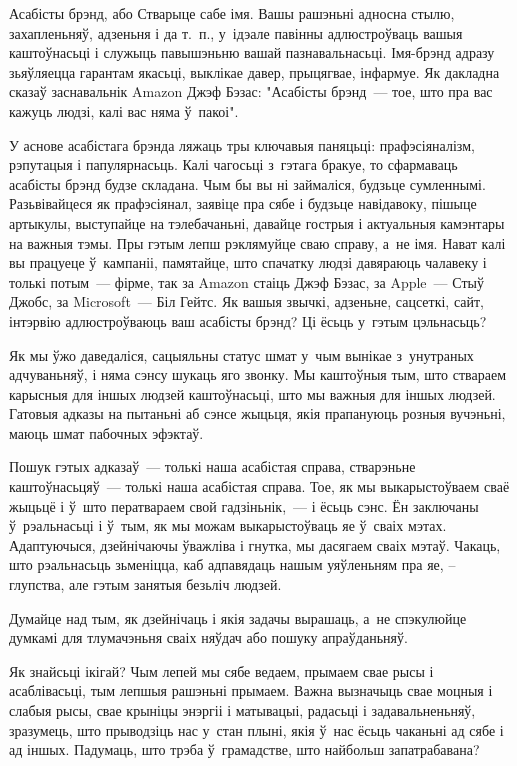 Асабісты брэнд, або Стварыце сабе імя. Вашы рашэньні адносна стылю, захапленьняў, адзеньня і да т.~п., у~ідэале павінны адлюстроўваць вашыя каштоўнасьці і служыць павышэньню вашай пазнавальнасьці. Імя-брэнд адразу зьяўляецца гарантам якасьці, выклікае давер, прыцягвае, інфармуе. Як дакладна сказаў заснавальнік Amazon Джэф Бэзас: "Асабісты брэнд~--- тое, што пра вас кажуць людзі, калі вас няма ў~пакоі".

У аснове асабістага брэнда ляжаць тры ключавыя паняцьці: прафэсіяналізм, рэпутацыя і папулярнасьць. Калі чагосьці з~гэтага бракуе, то сфармаваць асабісты брэнд будзе складана. Чым бы вы ні займаліся, будзьце сумленнымі. Разьвівайцеся як прафэсіянал, заявіце пра сябе і будзьце навідавоку, пішыце артыкулы, выступайце на тэлебачаньні, давайце гострыя і актуальныя камэнтары на важныя тэмы. Пры гэтым лепш рэклямуйце сваю справу, а~не імя. Нават калі вы працуеце ў~кампаніі, памятайце, што спачатку людзі давяраюць чалавеку і толькі потым~--- фірме, так за Amazon стаіць Джэф Бэзас, за Apple~--- Стыў Джобс, за Microsoft~--- Біл Гейтс. Як вашыя звычкі, адзеньне, сацсеткі, сайт, інтэрвію адлюстроўваюць ваш асабісты брэнд? Ці ёсьць у~гэтым цэльнасьць?

Як мы ўжо даведаліся, сацыяльны статус шмат у~чым вынікае з~унутраных адчуваньняў, і няма сэнсу шукаць яго звонку. Мы каштоўныя тым, што ствараем карысныя для іншых людзей каштоўнасьці, што мы важныя для іншых людзей. Гатовыя адказы на пытаньні аб сэнсе жыцьця, якія прапануюць розныя вучэньні, маюць шмат пабочных эфэктаў.

Пошук гэтых адказаў~--- толькі наша асабістая справа, стварэньне каштоўнасьцяў~--- толькі наша асабістая справа. Тое, як мы выкарыстоўваем сваё жыцьцё і ў~што ператвараем свой гадзіньнік,~--- і ёсьць сэнс. Ён заключаны ў~рэальнасьці і ў~тым, як мы можам выкарыстоўваць яе ў~сваіх мэтах. Адаптуючыся, дзейнічаючы ўважліва і гнутка, мы дасягаем сваіх мэтаў. Чакаць, што рэальнасьць зьменіцца, каб адпавядаць нашым уяўленьням пра яе, -- глупства, але гэтым занятыя безьліч людзей. 

Думайце над тым, як дзейнічаць і якія задачы вырашаць, а~не спэкулюйце думкамі для тлумачэньня сваіх няўдач або пошуку апраўданьняў.

Як знайсьці ікігай? Чым лепей мы сябе ведаем, прымаем свае рысы і асаблівасьці, тым лепшыя рашэньні прымаем. Важна вызначыць свае моцныя і слабыя рысы, свае крыніцы энэргіі і матывацыі, радасьці і задавальненьняў, зразумець, што прыводзіць нас у~стан плыні, якія ў~нас ёсьць чаканьні ад сябе і ад іншых. Падумаць, што трэба ў~грамадстве, што найбольш запатрабавана? 

